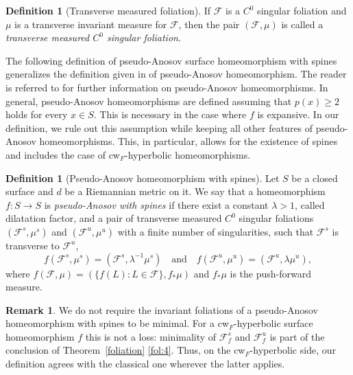 \documentclass{amsart}
\theoremstyle{plain}
\theoremstyle{definition}
\newtheorem{remark}[theorem]{Remark}
\newtheorem{definition}[theorem]{Definition}
\newcommand{\mc}{\mathcal}
\begin{document}
\begin{definition}[Transverse measured foliation]
If $\mc{F}$ is a $C^0$ singular foliation and $\mu$ is a transverse invariant measure for $\mc{F}$, then the pair $(\mc{F},\mu)$ is called a \textit{transverse measured $C^0$ singular foliation}.
\end{definition}

The following definition of pseudo-Anosov surface homeomorphism with spines generalizes the definition given in \cite{Hi2} of pseudo-Anosov homeomorphism. The reader is referred to \cite[Section 13]{FLPKM} for further information on pseudo-Anosov homeomorphisms. In general, pseudo-Anosov homeomorphisms are defined assuming that $p(x)\geq2$ holds for every $x\in S$. This is necessary in the case where $f$ is expansive. In our definition, we rule out this assumption while keeping all other features of pseudo-Anosov homeomorphisms. This, in particular, allows for the existence of spines and includes the case of cw$_F$-hyperbolic homeomorphisms.

\begin{definition}[Pseudo-Anosov homeomorphism with spines] Let $S$ be a closed surface and $d$ be a Riemannian metric on it. We say that a homeomorphism $f\colon S\to S$ is \emph{pseudo-Anosov with spines} if there exist a constant $\lambda>1$, called dilatation factor, and a pair of transverse measured $C^0$ singular foliations $(\mc{F}^s,\mu^s)$ and $(\mc{F}^u,\mu^u)$ with a finite number of singularities, such that $\mc{F}^s$ is transverse to $\mc{F}^u$, $$f(\mc{F}^s,\mu^s)=(\mc{F}^s,\lambda^{-1}\mu^s) \quad \text{and} \quad f(\mc{F}^u,\mu^u)=(\mc{F}^u,\lambda\mu^u),$$ 
where $f(\mc{F,\mu})
= (\{f(L): L\in \mc{F}\},f_*\mu)$ and $f_*\mu$ is the push-forward measure.
\end{definition}

\begin{remark}
We do not require the invariant foliations of a pseudo-Anosov
homeomorphism with spines to be minimal. For a cw$_F$-hyperbolic surface homeomorphism $f$ this is not a loss:
minimality of $\mc{F}^s_f$ and $\mc{F}^u_f$ is part of the conclusion of Theorem~\ref{foliation} \eqref{fol:4}. Thus, on
the cw$_F$-hyperbolic side, our definition agrees with the classical one wherever the latter applies.
\end{remark}
\end{document}
